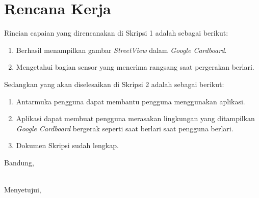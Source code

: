 \documentclass[a4paper,twoside]{article}
\begin{document}
\section{Rencana Kerja}
Rincian capaian yang direncanakan di Skripsi 1 adalah sebagai berikut:
\begin{enumerate}
\item Berhasil menampilkan gambar {\it StreetView} dalam {\it Google Cardboard}. 
\item Mengetahui bagian sensor yang menerima rangsang saat pergerakan berlari.
\end{enumerate}

Sedangkan yang akan diselesaikan di Skripsi 2 adalah sebagai berikut:
\begin{enumerate}
\item Antarmuka pengguna dapat membantu pengguna menggunakan aplikasi.
\item Aplikasi dapat membuat pengguna merasakan lingkungan yang ditampilkan {\it Google Cardboard} bergerak seperti saat berlari saat pengguna berlari.  
\item Dokumen Skripsi sudah lengkap.
\end{enumerate}


\vspace{7cm}
\centering Bandung, \tanggal\\
\vspace{2cm} \nama \\ 
\vspace{1cm}

Menyetujui, \\
\end{document}
